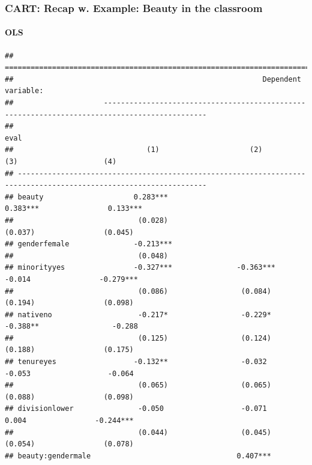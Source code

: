 \documentclass[
  shownotes,
  xcolor={svgnames},
  hyperref={colorlinks,citecolor=DarkBlue,linkcolor=DarkRed,urlcolor=DarkBlue}
  , aspectratio=169]{beamer}
\begin{document}
\begin{frame}[fragile]
\frametitle{CART: Recap w. Example: Beauty in the classroom}
\framesubtitle{OLS}


\begin{tiny}
\begin{verbatim}
## ==================================================================================================================
##                                                          Dependent variable:                                      
##                     ----------------------------------------------------------------------------------------------
##                                                                  eval                                             
##                               (1)                     (2)                     (3)                    (4)          
## ------------------------------------------------------------------------------------------------------------------
## beauty                     0.283***                                        0.383***                0.133***       
##                             (0.028)                                         (0.037)                (0.045)        
## genderfemale               -0.213***                                                                              
##                             (0.048)                                                                               
## minorityyes                -0.327***               -0.363***                -0.014                -0.279***       
##                             (0.086)                 (0.084)                 (0.194)                (0.098)        
## nativeno                    -0.217*                 -0.229*                -0.388**                 -0.288        
##                             (0.125)                 (0.124)                 (0.188)                (0.175)        
## tenureyes                  -0.132**                 -0.032                  -0.053                  -0.064        
##                             (0.065)                 (0.065)                 (0.088)                (0.098)        
## divisionlower               -0.050                  -0.071                   0.004                -0.244***       
##                             (0.044)                 (0.045)                 (0.054)                (0.078)        
## beauty:gendermale                                  0.407***                                                       

\end{verbatim}
\end{tiny}
\end{frame}
\end{document}
